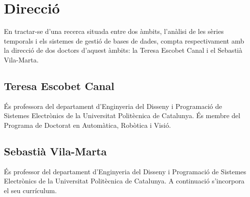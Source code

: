 \chapter{Direcció}


En tractar-se d'una recerca situada entre dos àmbits, l'anàlisi de les
sèries temporals i els sistemes de gestió de bases de dades, compta
respectivament amb la direcció de dos doctors d'aquest àmbits: la
Teresa Escobet Canal i el Sebastià Vila-Marta.

\section{Teresa Escobet Canal}

És professora del departament d'Enginyeria del Disseny i Programació de
Sistemes Electrònics de la Universitat Politècnica de Catalunya. 
És membre del Programa de Doctorat en Automàtica, Robòtica i Visió.



\section{Sebastià Vila-Marta}

És professor del departament d'Enginyeria del Disseny i Programació de
Sistemes Electrònics de la Universitat Politècnica de Catalunya.
A continuació s'incorpora el seu currículum.






